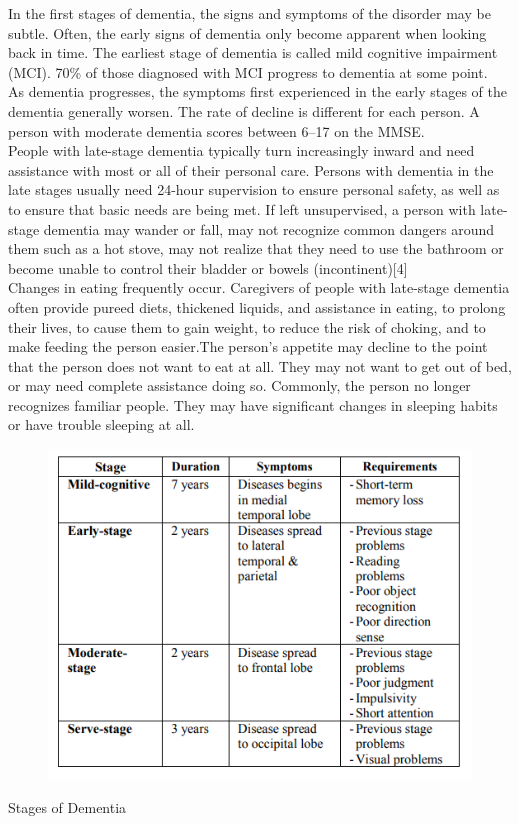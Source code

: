 In the first stages of dementia, the signs and symptoms of the disorder may be subtle. Often, the early signs of dementia only become apparent when looking back in time. The earliest stage of dementia is called mild cognitive impairment (MCI). 70\% of those diagnosed with MCI progress to dementia at some point.\\
As dementia progresses, the symptoms first experienced in the early stages of the dementia generally worsen. The rate of decline is different for each person. A person with moderate dementia scores between 6–17 on the MMSE.\\
People with late-stage dementia typically turn increasingly inward and need assistance with most or all of their personal care. Persons with dementia in the late stages usually need 24-hour supervision to ensure personal safety, as well as to ensure that basic needs are being met. If left unsupervised, a person with late-stage dementia may wander or fall, may not recognize common dangers around them such as a hot stove, may not realize that they need to use the bathroom or become unable to control their bladder or bowels (incontinent)[4]\\
Changes in eating frequently occur. Caregivers of people with late-stage dementia often provide pureed diets, thickened liquids, and assistance in eating, to prolong their lives, to cause them to gain weight, to reduce the risk of choking, and to make feeding the person easier.The person's appetite may decline to the point that the person does not want to eat at all. They may not want to get out of bed, or may need complete assistance doing so. Commonly, the person no longer recognizes familiar people. They may have significant changes in sleeping habits or have trouble sleeping at all.
\begin{figure}[h]
\begin{center}
\includegraphics[width = 13 cm]{3.PNG}
\end{center}
\end{figure}
\begin{table}[h]
\caption{Stages of Dementia}
\end{table}


